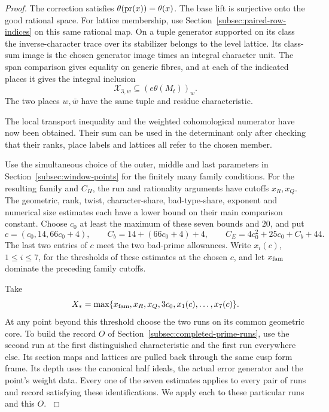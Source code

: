 \begin{proof}
The correction satisfies \(\theta({\rm pr}(x))=\theta(x)\). The base lift is surjective
onto the good rational space. For lattice membership, use
Section~\ref{subsec:paired-row-indices} on this same rational
map. On a tuple generator supported on its class the
inverse-character trace over its stabilizer belongs to the
level lattice. Its class-sum image is the chosen generator
image times an integral character unit. The span comparison gives equality on generic fibres, and at each of the indicated places it gives the integral inclusion
\[
 \mathcal X_{3,w}\subseteq(e\theta(M_t))_w .
\] The two places \(w,\bar w\) have
the same tuple and residue characteristic.
\label{cor:joint-family-estimate-5}

The local transport inequality and the weighted cohomological numerator have now been obtained. Their sum can be used in the determinant only after checking that their ranks, place labels and lattices all refer to the chosen member.

Use the simultaneous choice of the outer, middle and last
parameters in Section~\ref{subsec:window-points} for the
finitely many family conditions. For the resulting family
and \(C_H\), the run and rationality arguments have cutoffs
\(x_R,x_Q\). The geometric, rank, twist, character-share,
bad-type-share, exponent and numerical size estimates each
have a lower bound on their main comparison constant.
Choose \(c_0\) at least the maximum of these seven bounds
and \(20\), and put
\[
 c=(c_0,14,66c_0+4),\qquad C_b=14+(66c_0+4)+4,\qquad
 C_E=4c_0^2+25c_0+C_b+44 .
\]
The last two entries of \(c\) meet the two bad-prime allowances.
Write \(x_i(c)\), \(1\le i\le7\), for the thresholds of these estimates
at the chosen \(c\), and let \(x_{\rm fam}\) dominate the preceding family
cutoffs.

Take
\[
 X_*=\max\{x_{\rm fam},x_R,x_Q,3c_0,x_1(c),\ldots,x_7(c)\}.
\]
At any point beyond this threshold choose the two runs on its common
geometric core. To build the record \(O\) of
Section~\ref{subsec:completed-prime-runs}, use the second run at the
first distinguished characteristic and the first run everywhere else.
Its section maps and lattices are pulled back through the same
cusp form frame. Its depth uses the canonical half ideals, the
actual error generator and the point's weight data. Every
one of the seven estimates applies to every pair of runs and
record satisfying these identifications. We apply each to
these particular runs and this \(O\).
\label{cor:joint-family-estimate-6}


\end{proof}
